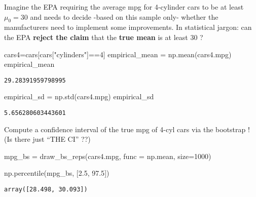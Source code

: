 \documentclass[
  letterpaper,
  DIV=11,
  numbers=noendperiod]{scrreprt}
\newenvironment{Shaded}{\begin{snugshade}}{\end{snugshade}}
\newcommand{\DecValTok}[1]{\textcolor[rgb]{0.68,0.00,0.00}{#1}}
\newcommand{\FloatTok}[1]{\textcolor[rgb]{0.68,0.00,0.00}{#1}}
\newcommand{\NormalTok}[1]{\textcolor[rgb]{0.00,0.23,0.31}{#1}}
\newcommand{\OperatorTok}[1]{\textcolor[rgb]{0.37,0.37,0.37}{#1}}
\newcommand{\StringTok}[1]{\textcolor[rgb]{0.13,0.47,0.30}{#1}}
\begin{document}
Imagine the EPA requiring the average mpg for 4-cylinder cars to be at
least \(\mu_0 = 30\) and needs to decide -based on this sample only-
whether the manufacturers need to implement some improvements. In
statistical jargon: can the EPA \textbf{reject the claim} that the
\textbf{true mean} is at least 30 ?

\begin{Shaded}
\begin{Highlighting}[]
\NormalTok{cars4}\OperatorTok{=}\NormalTok{cars[cars[}\StringTok{"cylinders"}\NormalTok{]}\OperatorTok{==}\DecValTok{4}\NormalTok{]}
\NormalTok{empirical\_mean }\OperatorTok{=}\NormalTok{ np.mean(cars4.mpg)}
\NormalTok{empirical\_mean}
\end{Highlighting}
\end{Shaded}

\begin{verbatim}
29.28391959798995
\end{verbatim}

\begin{Shaded}
\begin{Highlighting}[]
\NormalTok{empirical\_sd }\OperatorTok{=}\NormalTok{ np.std(cars4.mpg)}
\NormalTok{empirical\_sd}
\end{Highlighting}
\end{Shaded}

\begin{verbatim}
5.656280603443601
\end{verbatim}

Compute a confidence interval of the true mpg of 4-cyl cars via the
bootstrap ! (Is there just ``THE CI'' ??)

\begin{Shaded}
\begin{Highlighting}[]
\NormalTok{mpg\_bs }\OperatorTok{=}\NormalTok{ draw\_bs\_reps(cars4.mpg, func }\OperatorTok{=}\NormalTok{ np.mean, size}\OperatorTok{=}\DecValTok{1000}\NormalTok{)}
\end{Highlighting}
\end{Shaded}

\begin{Shaded}
\begin{Highlighting}[]
\NormalTok{np.percentile(mpg\_bs, [}\FloatTok{2.5}\NormalTok{, }\FloatTok{97.5}\NormalTok{])}
\end{Highlighting}
\end{Shaded}

\begin{verbatim}
array([28.498, 30.093])
\end{verbatim}
\end{document}
